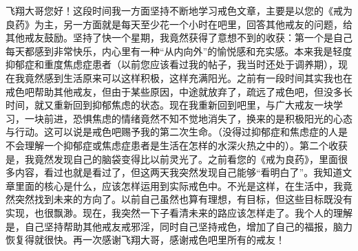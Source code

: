 \begin{case}
    飞翔大哥您好！这段时间我一方面坚持不断地学习戒色文章，主要是以您的《戒为良药》为主，另一方面就是每天至少花一个小时在吧里，回答其他戒友的问题，给其他戒友鼓励。坚持了快一个星期，我竟然获得了意想不到的收获：第一个是自己每天都感到非常快乐，内心里有一种“从内向外”的愉悦感和充实感。本来我是轻度抑郁症和重度焦虑症患者（以前您应该看过我的帖子，我当时还处于调养期），现在我竟然感到生活原来可以这样积极，这样充满阳光。之前有一段时间其实我也在戒色吧帮助其他戒友，但由于某些原因，中途就放弃了，疏远了戒色吧，但没多长时间，就又重新回到抑郁焦虑的状态。现在我重新回到吧里，与广大戒友一块学习，一块前进，恐惧焦虑的情绪竟然不知不觉地消失了，换来的是积极阳光的心态与行动。这可以说是戒色吧赐予我的第二次生命。（没得过抑郁症和焦虑症的人是不会理解一个抑郁症或焦虑症患者是生活在怎样的水深火热之中的）。第二个收获是，我竟然发现自己的脑袋变得比以前灵光了。之前看您的《戒为良药》，里面很多内容，看过也就是看过了，但这两天我突然发现自己能够“看明白了”。我知道文章里面的核心是什么，应该怎样运用到实际戒色中。不光是这样，在生活中，我竟然突然找到未来的方向了。以前自己虽然也算有理想，有目标，但这些目标既没有实现，也很飘渺。现在，我突然一下子看清未来的路应该怎样走了。我个人的理解是，自己坚持帮助其他戒友戒邪淫，同时自己坚持戒色，增加了自己的福报，脑力恢复得就很快。再一次感谢飞翔大哥，感谢戒色吧里所有的戒友！

\end{case}
